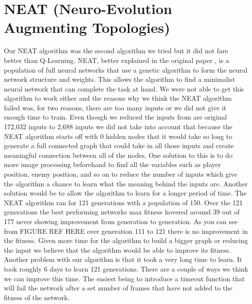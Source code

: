 \documentclass[12pt,journal,compsoc]{IEEEtran}
\begin{document}
\section{NEAT (Neuro-Evolution Augmenting Topologies)}
Our NEAT algorithm was the second algorithm we tried but it did not fare better than Q-Learning. NEAT, better explained in the original paper \cite{4}, is a population of full neural networks that use a genetic algorithm to form the neural network structure and weights. This allows the algorithm to find a minimalist neural network that can complete the task at hand. 
We were not able to get this algorithm to work either and the reasons why we think the NEAT algorithm failed was, for two reasons, there are too many inputs or we did not give it enough time to train. Even though we reduced the inputs from are original 172,032 inputs to 2,688 inputs we did not take into account that because the NEAT algorithm starts off with 0 hidden nodes that it would take so long to generate a full connected graph that could take in all those inputs and create meaningful connection between all of the nodes. One solution to this is to do more image processing beforehand to find all the variables such as player position, enemy position, and so on to reduce the number of inputs which give the algorithm a chance to learn what the meaning behind the inputs are. 
Another solution would be to allow the algorithm to learn for a longer period of time. The NEAT algorithm ran for 121 generations with a population of 150. Over the 121 generations the best performing networks max fitness hovered around 39 out of 177 never showing improvement from generation to generation. As you can see from {FIGURE REF HERE} over generation 111 to 121 there is no improvement in the fitness. Given more time for the algorithm to build a bigger graph or reducing the input we believe that the algorithm would be able to improve its fitness.
Another problem with our algorithm is that it took a very long time to learn. It took roughly 6 days to learn 121 generations. There are a couple of ways we think we can improve this time. The easiest being to introduce a timeout function that will fail the network after a set number of frames that have not added to the fitness of the network.
\end{document}

